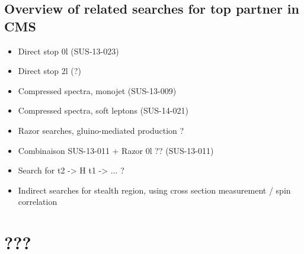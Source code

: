     \section{Overview of related searches for top partner in CMS \label{sec:analysis_overviewStopSearches}}
        
        \begin{itemize}
            \item Direct stop 0l (SUS-13-023)
            \item Direct stop 2l (?)
            \item Compressed spectra, monojet (SUS-13-009)


            \item Compressed spectra, soft leptons (SUS-14-021)
            \item Razor searches, gluino-mediated production ?
            \item Combinaison SUS-13-011 + Razor 0l ?? (SUS-13-011)
            \item Search for t2 -> H t1 -> ... ?
            \item Indirect searches for stealth region, using cross section measurement / spin correlation
        \end{itemize}


\chapter{???}
        \loremipsum


        \loremipsum




